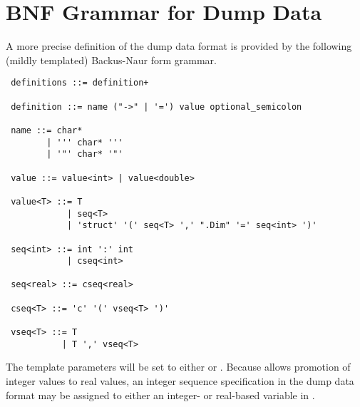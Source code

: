 \section{BNF Grammar for Dump Data}

A more precise definition of the dump data format is provided
by the following (mildly templated) Backus-Naur form grammar.

{\small 
\begin{verbatim}
 definitions ::= definition+

 definition ::= name ("->" | '=') value optional_semicolon

 name ::= char* 
        | ''' char* ''' 
        | '"' char* '"'

 value ::= value<int> | value<double>

 value<T> ::= T 
            | seq<T>
            | 'struct' '(' seq<T> ',' ".Dim" '=' seq<int> ')'

 seq<int> ::= int ':' int
            | cseq<int>

 seq<real> ::= cseq<real>

 cseq<T> ::= 'c' '(' vseq<T> ')'

 vseq<T> ::= T
           | T ',' vseq<T>
\end{verbatim}
}
\noindent
The template parameters  will be set to either  or
.  Because \Stan allows promotion of integer values to real
values, an integer sequence specification in the dump data format may
be assigned to either an integer- or real-based variable in \Stan.







